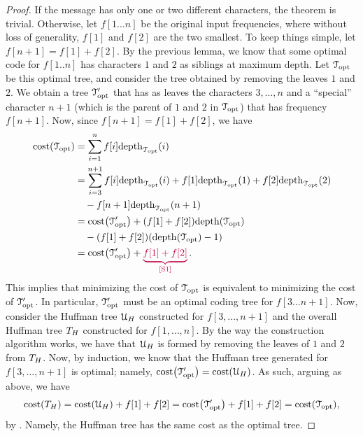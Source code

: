 \begin{proof}
    If the message has only one or two different characters, the
    theorem is trivial.  Otherwise, let $f[1 \ldots n]$ be the
    original input frequencies, where without loss of generality,
    $f[1]$ and $f[2]$ are the two smallest. To keep things simple, let
    $f[n + 1] = f[1] + f[2]$. By the previous lemma, we know that some
    optimal code for $f[1 .. n]$ has characters $1$ and $2$ as
    siblings at maximum depth. Let $\EuScript{T}_\mathrm{opt}$ be this optimal tree, and consider the
    tree obtained by removing the leaves $1$ and $2$. We obtain
    a tree $\EuScript{T}_\mathrm{opt}'$ that has as leaves the characters
    $3,\ldots, n$ and a ``special'' character $n+1$ (which is the
    parent of $1$ and $2$ in $\EuScript{T}_\mathrm{opt}$) that has frequency
    $f[n+1]$. Now, since $f[n+1] = f[1] + f[2]$, we have
    \begin{align}
        \costX{\TreeOpt} &= \sum_{i=1}^n f[i] \DepthExt{\TreeOpt}{i} \nonumber\\
        &= \sum_{i=3}^{n+1} f[i] \DepthExt{\TreeOpt}{i} + f[1]
        \DepthExt{\TreeOpt}{1} + f[2] \DepthExt{\TreeOpt}{2} \nonumber\\
        &\quad - f[n+1]
        \DepthExt{\TreeOpt}{n+1} \nonumber\\
        &= \costX{\TreeOptA} + \pth{\MakeSBig f[1] + f[2] }
        \depthX{\TreeOpt} \nonumber\\
        &\quad - \pth{\MakeSBig f[1] + f[2]
        } \pth{\depthX{\TreeOpt}-1} \nonumber\\
        &= \costX{\TreeOptA} + \markX{S1}{f[1] + f[2]}. %
        \eqlab{huffman:price}
    \end{align}
    This implies that minimizing the cost of $\EuScript{T}_\mathrm{opt}$ is equivalent
    to minimizing the cost of $\EuScript{T}_\mathrm{opt}'$. In particular, $\EuScript{T}_\mathrm{opt}'$
    must be an optimal coding tree for $f[3\ldots n+1]$. Now, consider
    the Huffman tree $\EuScript{U}_H$ constructed for $f[3, \ldots, n+1]$
    and the overall Huffman tree $T_H$ constructed for
    $f[1, \ldots, n]$. By the way the construction algorithm works, we
    have that $\EuScript{U}_H$ is formed by removing the leaves of $1$ and
    $2$ from $T_H$.  Now, by induction, we know that the Huffman
    tree generated for $f[3, \ldots, n+1]$ is optimal; namely,
    $\costX{\TreeOptA} = \costX{\TreeA_H}$.  As such, arguing as
    above, we have
    \begin{equation*}
    \costX{\Tree_H} = \costX{\TreeA_H} + f[1] + f[2] =
    \costX{\TreeOptA} + f[1] + f[2] = \costX{\TreeOpt},
    \end{equation*}
    by .  Namely, the Huffman tree has the same
    cost as the optimal tree.
\end{proof}


